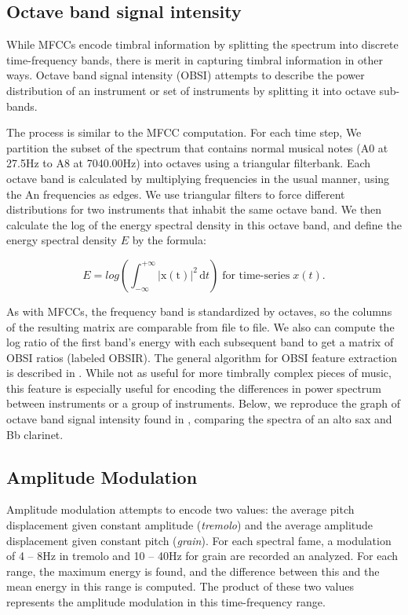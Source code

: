 \documentclass[12pt,twocolumn,titlepage]{article}
\begin{document}
\subsection{Octave band signal intensity}

While MFCCs encode timbral information by splitting the spectrum into discrete time-frequency bands, there is merit in capturing timbral information in other ways. Octave band signal intensity (OBSI) attempts to describe the power distribution of an instrument or set of instruments by splitting it into octave sub-bands. 


The process is similar to the MFCC computation. For each time step, We partition the subset of the spectrum that contains normal musical notes (A0 at 27.5Hz to A8 at 7040.00Hz) into octaves using a triangular filterbank. Each octave band is calculated by multiplying frequencies in the usual manner, using the An frequencies as edges. We use triangular filters to force different distributions for two instruments that inhabit the same octave band. We then calculate the log of the energy spectral density in this octave band, and define the energy spectral density $E$
 by the formula: \cite{Oppenheim}

\begin{equation}\label{}
E = log\left(\int_{-\infty}^{+\infty} \mathrm{|x(t)|}^2\, \mathrm{d}t\right) \; \text{for time-series} \; x(t).
\end{equation}

As with MFCCs, the frequency band is standardized by octaves, so the columns of the resulting matrix are comparable from file to file. We also can compute the log ratio of the first band's energy with each subsequent band to get a matrix of OBSI ratios (labeled OBSIR). The general algorithm for OBSI feature extraction is described in \cite{Essid}. While not as useful for more timbrally complex pieces of music, this feature is especially useful for encoding the differences in power spectrum between instruments or a group of instruments. Below, we reproduce the graph of octave band signal intensity found in \cite{Essid}, comparing the spectra of an alto sax and Bb clarinet.
\subsection{Amplitude Modulation}

Amplitude modulation attempts to encode two values: the average pitch displacement given constant amplitude (\emph{tremolo}) and the average amplitude displacement given constant pitch (\emph{grain}). \cite{Eronen} For each spectral fame, a modulation of 4 -- 8Hz in tremolo and 10 -- 40Hz for grain are recorded an analyzed. For  each range, the maximum energy is found, and the difference between this and the mean energy in this range is computed. \cite{yaafe} The product of these two values represents the amplitude modulation in this time-frequency range.
\end{document}
